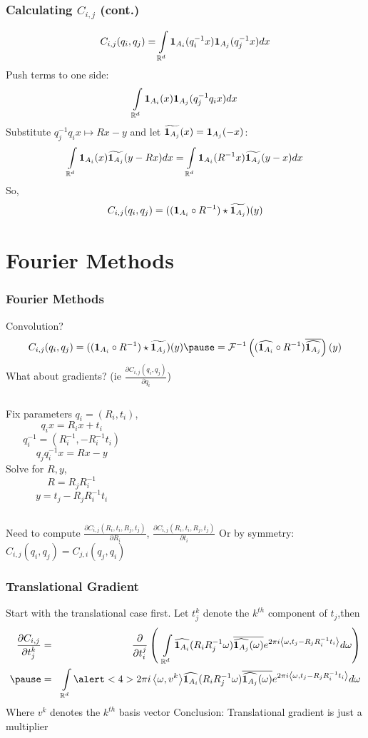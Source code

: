 \documentclass{beamer}
\begin{document}
\begin{frame}
\frametitle{Calculating $C_{i,j}$ (cont.)}
\[ C_{i,j}(q_i, q_j) = \int \limits_{\mathbb{R}^d} {\bf 1}_{A_i}(q_i^{-1} x) {\bf 1}_{A_j}(q_j^{-1} x) dx \]
\pause
Push terms to one side:
\[ \int \limits_{\mathbb{R}^d} {\bf 1}_{A_i}(x) {\bf 1}_{A_j}(q_j^{-1} q_i x) dx \]
\pause
Substitute $q_j^{-1} q_i x \mapsto Rx - y$ and let $\widetilde{{\bf 1}_{A_j}}(x) = {\bf 1}_{A_j}(-x)$:
\[ \int \limits_{\mathbb{R}^d} {\bf 1}_{A_i}(x) \widetilde{{\bf 1}_{A_j}}(y - Rx) dx = 
\int \limits_{\mathbb{R}^d} {\bf 1}_{A_i}(R^{-1} x) \widetilde{{\bf 1}_{A_j}}(y - x) dx\]
\pause
So,
\[ C_{i,j}(q_i, q_j) = (({\bf 1}_{A_i} \circ R^{-1}) \star \widetilde{{\bf 1}_{A_j}})(y) \]
\end{frame}

\section{Fourier Methods}
\begin{frame}
\frametitle{Fourier Methods}
Convolution? 
\[ C_{i,j}(q_i, q_j) = ((\ind{A_i} \circ R^{-1}) \star \widetilde{\ind{A_j}})(y)
\pause
= \mathcal{F}^{-1} \left ( (\widehat{\ind{A_i}} \circ R^{-1}) \overline{\widehat{\ind{A_j}}} \right )(y) \]
\pause
What about gradients? (ie $\frac{\partial C_{i,j}(q_i, q_j)}{\partial q_i}$)
\pause
\vskip5pt
\vskip5pt
\begin{columns}
		{\centering
		Fix parameters $q_i = (R_i, t_i)$, 
		\[q_i x = R_i x + t_i \]
		\[q_i^{-1} = (R_i^{-1}, -R_i^{-1} t_i) \]
		\[q_j q_i^{-1} x = Rx - y\]
		}
		\pause
		{\centering
		Solve for $R, y$,
		\[ R = R_j R_i^{-1} \]
		\[ y = t_j - R_j R_i^{-1} t_i \]
		}
\end{columns}
\pause
Need to compute $\frac{\partial C_{i,j}(R_i, t_i, R_j, t_j)}{\partial R_i}$, $\frac{\partial C_{i,j}(R_i, t_i, R_j, t_j)}{\partial t_i}$
\vskip5pt
Or by symmetry: $C_{i,j}(q_i, q_j) = C_{j,i}(q_j, q_i)$
\end{frame}

\begin{frame}
\frametitle{Translational Gradient}
Start with the translational case first.
\vskip5pt
Let $t_j^k$ denote the $k^{th}$ component of $t_j$,\pause then
\begin{eqnarray*}
\frac{ \partial C_{i,j} }{ \partial t_j^k }
& = & \frac{ \partial }{ \partial t_i^j } \left( \:\: \int \limits_{\R^d} \widehat{\ind{A_i}}(R_i R_j^{-1} \omega) \overline{\widehat{\ind{A_j}}(\omega)} e^{2 \pi i \inner{\omega}{t_j - R_j R_i^{-1} t_i}} d \omega  \right ) \\
\pause & = & \int \limits_{\R^d} 
\alert<4>{2 \pi i \inner{\omega}{v^k}}
\widehat{\ind{A_i}}(R_i R_j^{-1} \omega) \overline{\widehat{\ind{A_j}}(\omega)} e^{2 \pi i \inner{\omega}{t_j - R_j R_i^{-1} t_i} } d \omega
\end{eqnarray*}
Where $v^k$ denotes the $k^{th}$ basis vector
\pause
\vskip5pt
Conclusion: Translational gradient is just a multiplier
\end{frame}
\end{document}
